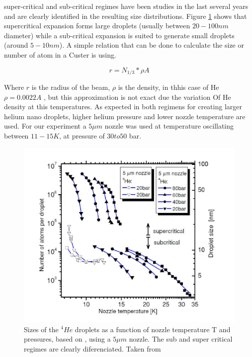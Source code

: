 super-critical and sub-critical regimes have been studies  in the last several years and  are clearly identified in the resulting size distributions. Figure \ref{img:dropletSize} shows that supercritical expansion forms large droplets (usually between $20-100 nm$ diameter) while a sub-critical expansion is suited to generate small droplets (around $5-10 nm$).  A simple relation that can be done to calculate the size or number of atom in a Custer is using. 

\begin{equation}
r=N_{1/3} * \rho A
\end{equation}

Where $r$ is the radius of the beam, $\rho$ is the density, in thhis case of He $\rho =0.0022 A $ \cite{stringari_systematics_1987}, but this approximation is not exact due the variation Of He density at this temperatures. As expected in both regimens for creating larger helium nano droplets, higher helium pressure and lower nozzle temperature are used. For our experiment a $5 \mu m$ nozzle was used at temperature oscillating between $11-15 K$, at pressure of $30 to 50$ bar.

\begin{figure}[hbtp]
\centering
\label{img:dropletSize}
\includegraphics[scale=0.4]{../Images/sizes_regimen.PNG}
\caption[Expantion droplets Regimens]{Sizes of the $^{4}He$ droplets  as a function of nozzle temperature T and  pressures, based on \cite{toennies_spectroscopy_1998}, using a $5 \mu m$ nozzle. The sub and super critical regimes are clearly diferenciated. Taken from \cite{stienkemeier_spsectroscopy_2006}}
\end{figure}


